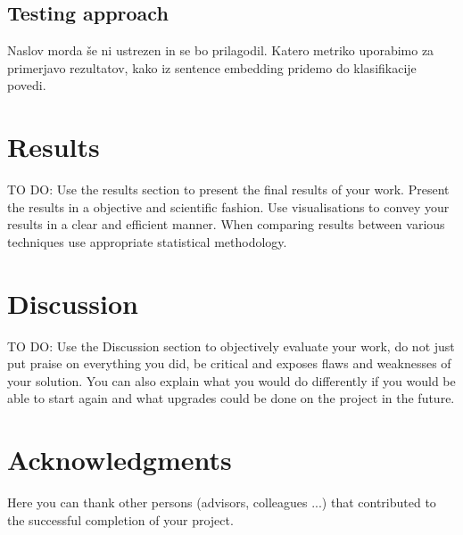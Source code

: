 \documentclass[fleqn,moreauthors,10pt]{ds_report}
\begin{document}
\subsection*{Testing approach}
Naslov morda še ni ustrezen in se bo prilagodil.
Katero metriko uporabimo za primerjavo rezultatov, kako iz sentence embedding pridemo do klasifikacije povedi.




\section*{Results}

TO DO:
Use the results section to present the final results of your work. Present the results in a objective and scientific fashion. Use visualisations to convey your results in a clear and efficient manner. When comparing results between various techniques use appropriate statistical methodology.



\section*{Discussion}

TO DO:
Use the Discussion section to objectively evaluate your work, do not just put praise on everything you did, be critical and exposes flaws and weaknesses of your solution. You can also explain what you would do differently if you would be able to start again and what upgrades could be done on the project in the future.



\section*{Acknowledgments}

Here you can thank other persons (advisors, colleagues ...) that contributed to the successful completion of your project.




\end{document}
